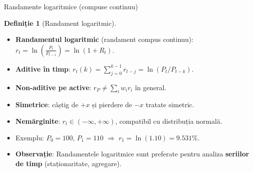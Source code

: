 \documentclass[9pt, aspectratio=169, t]{beamer}
\theoremstyle{definition}
\newtheorem{defn}{Definiție}
\begin{document}
\begin{frame}{Randamente logaritmice (compuse continuu)}
\begin{defn}[Randament logaritmic]
\begin{itemize}\setlength{\itemsep}{1pt}
    \item \textbf{Randamentul logaritmic} (randament compus continuu):
    $r_t = \ln\!\left(\frac{P_t}{P_{t-1}}\right) = \ln(1 + R_t).$
\end{itemize}
\end{defn}
\vspace{0.1cm}
\begin{itemize}
    \item \textbf{Aditive în timp}: $r_t(k) = \sum_{j=0}^{k-1} r_{t-j} = \ln(P_t / P_{t-k})$.
    \item \textbf{Non-aditive pe active}: $r_P \neq \sum_i w_i r_i$ în general.
    \item \textbf{Simetrice}: câștig de $+x$ și pierdere de $-x$ tratate simetric.
    \item \textbf{Nemărginite}: $r_t \in (-\infty, +\infty)$, compatibil cu distribuția normală.
    \item Exemplu: $P_0=100$, $P_1=110$ $\Rightarrow$ $r_1 = \ln(1.10) = 9.531\%$.
\end{itemize}
\vspace{0.05cm}
\begin{itemize}
    \item \textbf{Observație}: Randamentele logaritmice sunt preferate pentru analiza \textbf{seriilor de timp} (staționaritate, agregare).
\end{itemize}
\end{frame}
\end{document}
